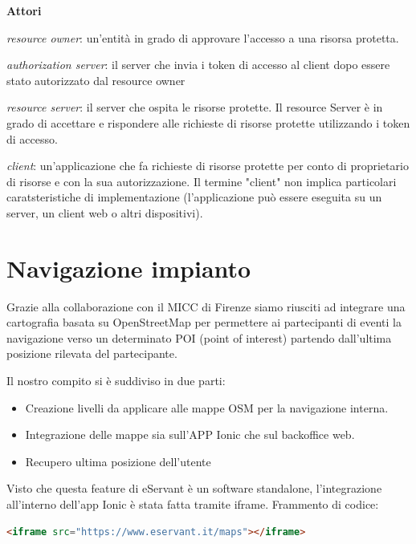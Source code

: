 \textbf{Attori}

\textit{resource owner}: un'entità in grado di approvare l'accesso a una risorsa protetta.

\textit{authorization server}: il server che invia i token di accesso al client dopo essere stato autorizzato
dal resource owner

\textit{resource server}: il server che ospita le risorse protette. Il resource Server è in grado di accettare
e rispondere alle richieste di risorse protette utilizzando i token di accesso.

\textit{client}: un'applicazione che fa richieste di risorse protette per conto di
proprietario di risorse e con la sua autorizzazione. Il termine "client"
non implica particolari caratsteristiche di implementazione (l'applicazione può essere eseguita
su un server, un client web o altri dispositivi).


\section{Navigazione impianto}
Grazie alla collaborazione con il MICC di Firenze siamo riusciti ad integrare una cartografia basata su OpenStreetMap
per permettere ai partecipanti di eventi la navigazione verso un determinato POI (point of interest) partendo
dall'ultima posizione rilevata del partecipante.

Il nostro compito si è suddiviso in due parti:
\begin{itemize}
\item Creazione livelli da applicare alle mappe OSM per la navigazione interna.
\item Integrazione delle mappe sia sull'APP Ionic che sul backoffice web.
\item Recupero ultima posizione dell'utente
\end{itemize}

Visto che questa feature di eServant è un software standalone, l'integrazione all'interno dell'app Ionic è stata fatta
tramite iframe.
Frammento di codice:
\begin{lstlisting}[language=html]
<iframe src="https://www.eservant.it/maps"></iframe>
\end{lstlisting}

\paragraph{}

